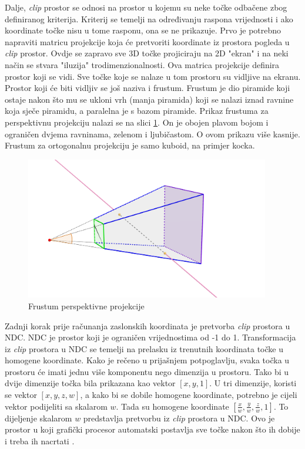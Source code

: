 \documentclass{foi}
\begin{document}
Dalje, \textit{clip} prostor se odnosi na prostor u kojemu su neke točke odbačene zbog definiranog kriterija. Kriterij se temelji na određivanju raspona vrijednosti i ako koordinate točke nisu u tome rasponu, ona se ne prikazuje. Prvo je potrebno napraviti matricu projekcije koja će pretvoriti koordinate iz prostora pogleda u \textit{clip} prostor. Ovdje se zapravo sve 3D točke projiciraju na 2D "ekran" i na neki način se stvara "iluzija" trodimenzionalnosti. Ova matrica projekcije definira prostor koji se vidi. Sve točke koje se nalaze u tom prostoru su vidljive na ekranu. Prostor koji će biti vidljiv se još naziva i frustum. Frustum je dio piramide koji ostaje nakon što mu se ukloni vrh (manja piramida) koji se nalazi iznad ravnine koja sječe piramidu, a paralelna je s bazom piramide. Prikaz frustuma za perspektivnu projekciju nalazi se na slici \ref{fig:FrustumPerpspektivneProjekcije}. On je obojen plavom bojom i ograničen dvjema ravninama, zelenom i ljubičastom. O ovom prikazu više kasnije. Frustum za ortogonalnu projekciju je samo kuboid, na primjer kocka.


\begin{figure}[H]
	\centering	\includegraphics[width=0.95\textwidth,trim={4cm 0cm 10cm 0cm},clip]{slike/35_FrustumPerspektivneProjekcije.png}
	\captionsetup{justification=centering}
	\caption{Frustum perspektivne projekcije}
	\label{fig:FrustumPerpspektivneProjekcije}
\end{figure}

Zadnji korak prije računanja zaslonskih koordinata je pretvorba \textit{clip} prostora u NDC. NDC je prostor koji je ograničen vrijednostima od -1 do 1. Transformacija iz \textit{clip} prostora u NDC se temelji na prelasku iz trenutnih koordinata točke u homogene koordinate. Kako je rečeno u prijašnjem potpoglavlju, svaka točka u prostoru će imati jednu više komponentu nego dimenzija u prostoru. Tako bi u dvije dimenzije točka bila prikazana kao vektor $[x, y, 1]$. U tri dimenzije, koristi se vektor $[x, y, z, w]$, a kako bi se dobile homogene koordinate, potrebno je cijeli vektor podijeliti sa skalarom $w$. Tada su homogene koordinate $[\frac{x}{w},\frac {y}{w}, \frac{z}{w}, 1]$. To dijeljenje skalarom $w$ predstavlja pretvorbu iz \textit{clip} prostora u NDC. Ovo je prostor u koji grafički procesor automatski postavlja sve točke nakon što ih dobije i treba ih nacrtati \parencite{Prostori3DBezDat}. 
\end{document}
